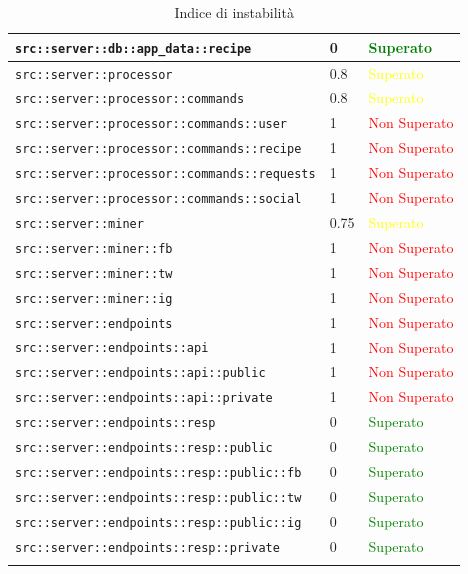 \begin{center}
\begin{longtable}{| p{8.5cm} | p{3.5cm} | p{3cm} |}
					\hline
					\texttt{src::server::db::app\_data::recipe} & 0 & \textcolor{green}{Superato}\\
					\hline
					\texttt{src::server::processor} & 0.8 & \textcolor{yellow}{Superato}\\
					\hline
					\texttt{src::server::processor::commands} & 0.8 & \textcolor{yellow}{Superato}\\
					\hline
					\texttt{src::server::processor::commands::user} & 1 & \textcolor{red}{Non Superato}\\
					\hline
					\texttt{src::server::processor::commands::recipe} & 1 & \textcolor{red}{Non Superato}\\
					\hline
					\texttt{src::server::processor::commands::requests} & 1 & \textcolor{red}{Non Superato}\\
					\hline
					\texttt{src::server::processor::commands::social} & 1 & \textcolor{red}{Non Superato}\\
					\hline
					\texttt{src::server::miner} & 0.75 & \textcolor{yellow}{Superato}\\
					\hline
					\texttt{src::server::miner::fb} & 1 & \textcolor{red}{Non Superato}\\
					\hline
					\texttt{src::server::miner::tw} & 1 & \textcolor{red}{Non Superato}\\
					\hline
					\texttt{src::server::miner::ig} & 1 & \textcolor{red}{Non Superato}\\
					\hline
					\texttt{src::server::endpoints} & 1 & \textcolor{red}{Non Superato}\\
					\hline
					\texttt{src::server::endpoints::api} & 1 & \textcolor{red}{Non Superato}\\
					\hline
					\texttt{src::server::endpoints::api::public} & 1 & \textcolor{red}{Non Superato}\\
					\hline
					\texttt{src::server::endpoints::api::private} & 1 & \textcolor{red}{Non Superato}\\
					\hline
					\texttt{src::server::endpoints::resp} & 0 & \textcolor{green}{Superato}\\
					\hline
					\texttt{src::server::endpoints::resp::public} & 0 & \textcolor{green}{Superato}\\
					\hline
					\texttt{src::server::endpoints::resp::public::fb} & 0 & \textcolor{green}{Superato}\\
					\hline
					\texttt{src::server::endpoints::resp::public::tw} & 0 & \textcolor{green}{Superato}\\
					\hline
					\texttt{src::server::endpoints::resp::public::ig} & 0 & \textcolor{green}{Superato}\\
					\hline
					\texttt{src::server::endpoints::resp::private} & 0 & \textcolor{green}{Superato}\\
					\hline
					\caption{Indice di instabilità}
				\end{longtable}
				\egroup
			\end{center}		
			
